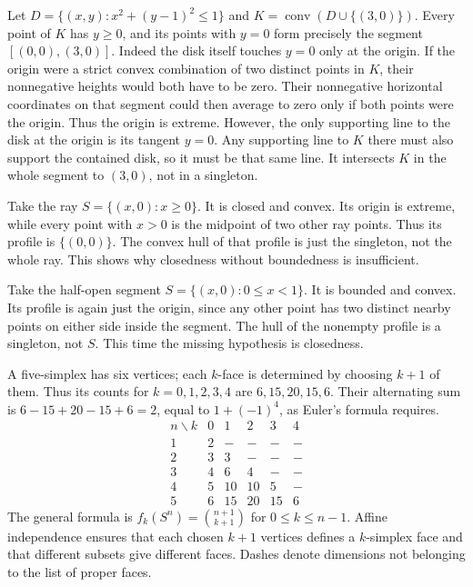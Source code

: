 Let $D=\{(x,y):x^2+(y-1)^2\le1\}$ and
$K=\operatorname{conv}(D\cup\{(3,0)\})$.
Every point of $K$ has $y\ge0$, and its points with $y=0$ form precisely
the segment $[(0,0),(3,0)]$. Indeed the disk itself touches $y=0$ only
at the origin.
If the origin were a strict convex combination of two distinct points in
$K$, their nonnegative heights would both have to be zero. Their
nonnegative horizontal coordinates on that segment could then average to
zero only if both points were the origin. Thus the origin is extreme.
However, the only supporting line to the disk at the origin is its tangent
$y=0$. Any supporting line to $K$ there must also support the contained
disk, so it must be that same line. It intersects $K$ in the whole segment
to $(3,0)$, not in a singleton.

Take the ray $S=\{(x,0):x\ge0\}$. It is closed and convex.
Its origin is extreme, while every point with $x>0$ is the midpoint of
two other ray points. Thus its profile is $\{(0,0)\}$.
The convex hull of that profile is just the singleton, not the whole ray.
This shows why closedness without boundedness is insufficient.

Take the half-open segment $S=\{(x,0):0\le x<1\}$.
It is bounded and convex. Its profile is again just the origin, since
any other point has two distinct nearby points on either side inside the segment.
The hull of the nonempty profile is a singleton, not $S$.
This time the missing hypothesis is closedness.

A five-simplex has six vertices; each $k$-face is determined by choosing
$k+1$ of them. Thus its counts for $k=0,1,2,3,4$ are
$6,15,20,15,6$. Their alternating sum is $6-15+20-15+6=2$,
equal to $1+(-1)^4$, as Euler's formula requires.
\[
 \begin{array}{c|rrrrr}
 n\backslash k&0&1&2&3&4\\\hline
 1&2&-&-&-&-\\2&3&3&-&-&-\\3&4&6&4&-&-\\
 4&5&10&10&5&-\\5&6&15&20&15&6
 \end{array}
\]
The general formula is $f_k(S^n)=\binom{n+1}{k+1}$ for $0\le k\le n-1$.
Affine independence ensures that each chosen $k+1$ vertices defines a
$k$-simplex face and that different subsets give different faces.
Dashes denote dimensions not belonging to the list of proper faces.


